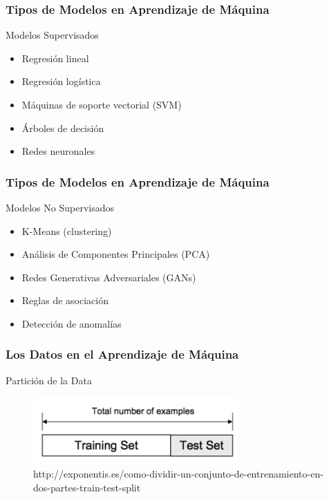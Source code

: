 \documentclass{beamer}
\begin{document}
\begin{frame}
	\frametitle{Tipos de Modelos en Aprendizaje de Máquina}
	
	\begin{block}{Modelos Supervisados}
	\begin{itemize}
		\item Regresión lineal
		\item Regresión logística
		\item Máquinas de soporte vectorial (SVM)
		\item Árboles de decisión
		\item Redes neuronales
	\end{itemize}
\end{block}

\end{frame}

	
\begin{frame}
	\frametitle{Tipos de Modelos en Aprendizaje de Máquina}
		\begin{block}{Modelos No Supervisados}
	\begin{itemize}
		\item K-Means (clustering)
		\item Análisis de Componentes Principales (PCA)
		\item Redes Generativas Adversariales (GANs)
		\item Reglas de asociación
		\item Detección de anomalías
	\end{itemize}
\end{block}
\end{frame}
	
\begin{frame}
	\frametitle{Los Datos en el Aprendizaje de Máquina}
	\begin{block}{Partición de la Data}	
		\begin{figure}
			\includegraphics[width=0.7\textwidth]{entrenamiento_prueba}
			\caption{http://exponentis.es/como-dividir-un-conjunto-de-entrenamiento-en-dos-partes-train-test-split}
		\end{figure}
	\end{block}
\end{frame}
	
\end{document}
